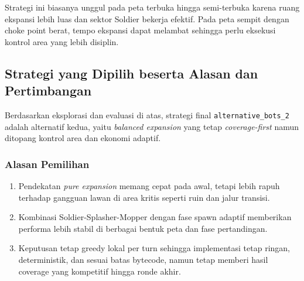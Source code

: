 Strategi ini biasanya unggul pada peta terbuka hingga semi-terbuka karena ruang ekspansi lebih luas dan sektor Soldier bekerja efektif. Pada peta sempit dengan choke point berat, tempo ekspansi dapat melambat sehingga perlu eksekusi kontrol area yang lebih disiplin.

\subsection{Strategi yang Dipilih beserta Alasan dan Pertimbangan}

Berdasarkan eksplorasi dan evaluasi di atas, strategi final \texttt{alternative\_bots\_2} adalah alternatif kedua, yaitu \textit{balanced expansion} yang tetap \textit{coverage-first} namun ditopang kontrol area dan ekonomi adaptif.

\subsubsection{Alasan Pemilihan}

\begin{enumerate}
    \item Pendekatan \textit{pure expansion} memang cepat pada awal, tetapi lebih rapuh terhadap gangguan lawan di area kritis seperti ruin dan jalur transisi.

    \item Kombinasi Soldier-Splasher-Mopper dengan fase spawn adaptif memberikan performa lebih stabil di berbagai bentuk peta dan fase pertandingan.

    \item Keputusan tetap greedy lokal per turn sehingga implementasi tetap ringan, deterministik, dan sesuai batas bytecode, namun tetap memberi hasil coverage yang kompetitif hingga ronde akhir.
\end{enumerate}
